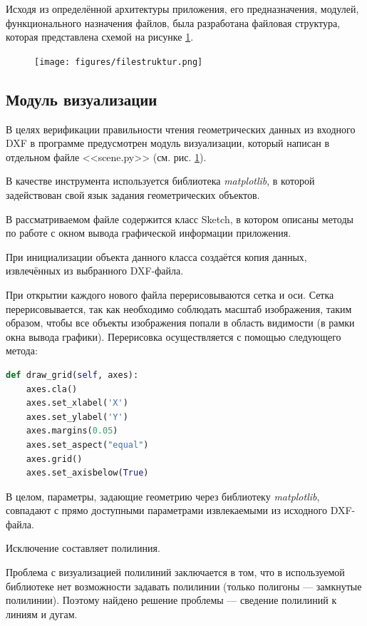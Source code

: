 
Исходя из определённой архитектуры приложения, его предназначения, модулей, функционального назначения файлов, была разработана файловая структура, которая представлена схемой на рисунке \ref{fig:filestruktur}.

\begin{figure}[H]
	\centering
	\texttt{[image: figures/filestruktur.png]}
	\label{fig:filestruktur}
\end{figure}

\subsection{Модуль визуализации}

В целях верификации правильности чтения геометрических данных из входного DXF в программе предусмотрен модуль визуализации, который написан в отдельном файле <<scene.py>> (см. рис. \ref{fig:filestruktur}).

В качестве инструмента используется библиотека \textit{matplotlib}, в которой задействован свой язык задания геометрических объектов.

В рассматриваемом файле содержится класс Sketch, в котором описаны методы по работе с окном вывода графической информации приложения.

При инициализации объекта данного класса создаётся копия данных, извлечённых из выбранного DXF-файла.

При открытии каждого нового файла перерисовываются сетка и оси. Сетка перерисовывается, так как необходимо соблюдать масштаб изображения, таким образом, чтобы все объекты изображения попали в область видимости (в рамки окна вывода графики). Перерисовка осуществляется с помощью следующего метода:
\begin{lstlisting}[language=python,label=list:redraw]
def draw_grid(self, axes):
	axes.cla()
	axes.set_xlabel('X')
	axes.set_ylabel('Y')
	axes.margins(0.05)
	axes.set_aspect("equal")
	axes.grid()
	axes.set_axisbelow(True)
\end{lstlisting}

В целом, параметры, задающие геометрию через библиотеку \textit{matplotlib}, совпадают с прямо доступными параметрами извлекаемыми из исходного DXF-файла.

Исключение составляет полилиния.

Проблема с визуализацией полилиний заключается в том, что в используемой библиотеке нет возможности задавать полилинии (только полигоны --- замкнутые полилинии). Поэтому найдено решение проблемы --- сведение полилиний к линиям и дугам.

